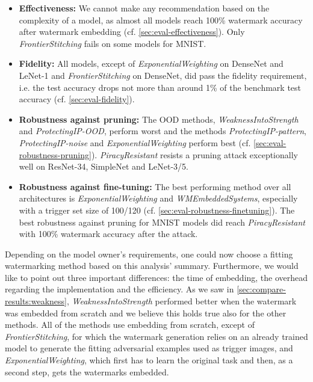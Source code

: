 \begin{itemize}
    \item \textbf{Effectiveness:} We cannot make any recommendation based on the complexity of a model, as almost all models reach 100\% watermark accuracy after watermark embedding (cf. \cref{sec:eval-effectiveness}). Only \textit{FrontierStitching} fails on some models for MNIST.
    \item \textbf{Fidelity:} All models, except of \textit{ExponentialWeighting} on DenseNet and LeNet-1 and \textit{FrontierStitching} on DenseNet, did pass the fidelity requirement, i.e. the test accuracy drops not more than around 1\% of the benchmark test accuracy (cf. \cref{sec:eval-fidelity}).
    \item \textbf{Robustness against pruning:} The OOD methods, \textit{WeaknessIntoStrength} and \textit{ProtectingIP-OOD}, perform worst and the methods \textit{ProtectingIP-pattern}, \textit{ProtectingIP-noise} and \textit{ExponentialWeighting} perform best (cf. \cref{sec:eval-robustness-pruning}). \textit{PiracyResistant} resists a pruning attack exceptionally well on ResNet-34, SimpleNet and LeNet-3/5.
    \item \textbf{Robustness against fine-tuning:} The best performing method over all architectures is \textit{ExponentialWeighting} and \textit{WMEmbeddedSystems}, especially with a trigger set size of 100/120 (cf. \cref{sec:eval-robustness-finetuning}). The best robustness against pruning for MNIST models did reach \textit{PiracyResistant} with 100\% watermark accuracy after the attack.
\end{itemize}


Depending on the model owner's requirements, one could now choose a fitting watermarking method based on this analysis' summary. Furthermore, we would like to point out three important differences: the time of embedding, the overhead regarding the implementation and the efficiency. As we saw in \cref{sec:compare-results:weakness}, \textit{WeaknessIntoStrength} performed better when the watermark was embedded from scratch and we believe this holds true also for the other methods. All of the methods use embedding from scratch, except of \textit{FrontierStitching}, for which the watermark generation relies on an already trained model to generate the fitting adversarial examples used as trigger images, and \textit{ExponentialWeighting}, which first has to learn the original task and then, as a second step, gets the watermarks embedded.


